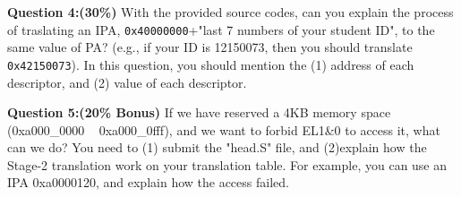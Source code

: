 \textbf{Question 4:(30\%)} With the provided source codes, can you 
explain 
the process of traslating an IPA, \texttt{0x40000000}+"last 7 numbers 
of your student ID", to the same value of PA? (e.g., if your ID is 
12150073, then you should translate \texttt{0x42150073}).
In this question, you should mention the (1) address of each 
descriptor, and (2) value of each descriptor.

\textbf{Question 5:(20\% Bonus)} If we have reserved a 4KB memory space (0xa000\_0000 ~ 0xa000\_0fff), and we
want to forbid EL1\&0 to access it, what can we do? You need to (1) submit the "head.S" file, and (2)explain how the Stage-2 translation work on your translation table. For example, you can use an IPA 0xa0000120, and explain how the access failed.




